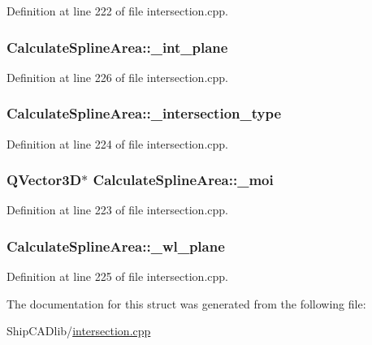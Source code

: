 Definition at line 222 of file intersection.\-cpp.

\hypertarget{structCalculateSplineArea_a4d0feb7db0aca705a54f2f612290e970}{
\subsubsection[{\-\_\-int\-\_\-plane}]{ Calculate\-Spline\-Area\-::\-\_\-int\-\_\-plane}}\label{structCalculateSplineArea_a4d0feb7db0aca705a54f2f612290e970}


Definition at line 226 of file intersection.\-cpp.

\hypertarget{structCalculateSplineArea_aae716b66f114f0217e68efc79ca9cc91}{
\subsubsection[{\-\_\-intersection\-\_\-type}]{ Calculate\-Spline\-Area\-::\-\_\-intersection\-\_\-type}}\label{structCalculateSplineArea_aae716b66f114f0217e68efc79ca9cc91}


Definition at line 224 of file intersection.\-cpp.

\hypertarget{structCalculateSplineArea_afcd9ae27bc3f89b4fa995f7f1cfd2746}{
\subsubsection[{\-\_\-moi}]{\setlength{\rightskip}{0pt plus 5cm}Q\-Vector3\-D$\ast$ Calculate\-Spline\-Area\-::\-\_\-moi}}\label{structCalculateSplineArea_afcd9ae27bc3f89b4fa995f7f1cfd2746}


Definition at line 223 of file intersection.\-cpp.

\hypertarget{structCalculateSplineArea_a0f3126c4f34b545eea5bbce5f340f21c}{
\subsubsection[{\-\_\-wl\-\_\-plane}]{ Calculate\-Spline\-Area\-::\-\_\-wl\-\_\-plane}}\label{structCalculateSplineArea_a0f3126c4f34b545eea5bbce5f340f21c}


Definition at line 225 of file intersection.\-cpp.



The documentation for this struct was generated from the following file\-:\begin{DoxyCompactItemize}
\item 
Ship\-C\-A\-Dlib/\hyperlink{intersection_8cpp}{intersection.\-cpp}\end{DoxyCompactItemize}
